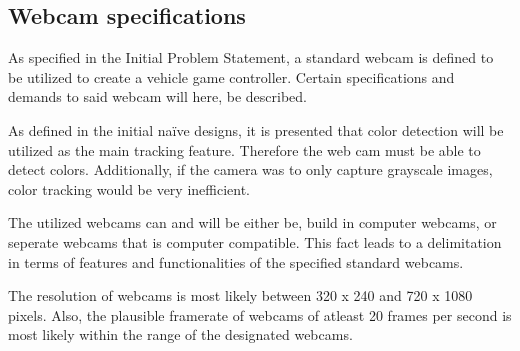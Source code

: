 \subsection{Webcam specifications}
As specified in the Initial Problem Statement, a standard webcam is defined to be utilized to create a vehicle game controller. Certain specifications and demands to said webcam will here, be described.

As defined in the initial naïve designs, it is presented that color detection will be utilized as the main tracking feature. Therefore the web cam must be able to detect colors. Additionally, if the camera was to only capture grayscale images, color tracking would be very inefficient.  

The utilized webcams can and will be either be, build in computer webcams, or seperate webcams that is computer compatible. This fact leads to a delimitation in terms of features and functionalities of the specified standard webcams.

The resolution of webcams is most likely between 320 x 240 and 720 x 1080 pixels. Also, the plausible framerate of webcams of atleast 20 frames per second is most likely within the range of the designated webcams.

	